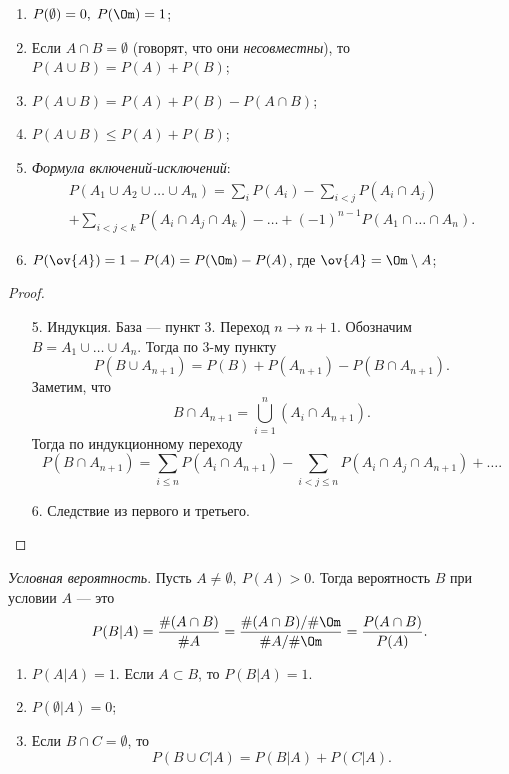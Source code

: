  \begin{properties}[вероятности]
     \begin{enumerate}
         \item $P(\emptyset) = 0, \; P(\Om) = 1$;
         \item Если $A \cap B = \emptyset$ (говорят, что они \textit{несовместны}), то $P(A \cup B) = P(A) + P(B)$;
         \item $P(A \cup B) = P(A) + P(B) - P(A \cap B)$;
         \item $P(A \cup B) \leq P(A) + P(B)$;
         \item \textit{Формула включений-исключений}:
         \begin{multline*}
              P(A_1\cup A_2 \cup \ldots \cup A_n) = \sum_i{P(A_i)} - \sum_{i<j}P(A_i\cap A_j) \\+ \sum_{i<j<k}P(A_i\cap A_j \cap A_k) - \ldots +(-1)^{n-1}P(A_1\cap\ldots\cap A_n).
         \end{multline*}
     
         \item $P(\ov{A}) = 1 - P(A) = P(\Om) - P(A)$, где $\ov{A} = \Om \setminus A$;
     \end{enumerate}
 \end{properties}

 \begin{proof}
 \begin{enumerate}
     \item[5.]Индукция. База --- пункт 3. Переход $n \to n+1$.
    Обозначим $B = A_1 \cup \ldots \cup A_n$. Тогда по 3-му пункту
     $$P(B\cup A_{n+1}) = P(B) +  P(A_{n+1}) - P(B\cap A_{n+1}).$$
    Заметим, что 
    $$B\cap A_{n+1} = \bigcup_{i=1}^n(A_i\cap A_{n+1}).$$
    Тогда по индукционному переходу
    $$P(B\cap A_{n+1}) = \sum_{i\leq n}P(A_i\cap A_{n+1}) - \sum_{i<j\leq n}P(A_i\cap A_j \cap A_{n+1}) + \ldots.$$
    \item[6.] Следствие из первого и третьего. \qedhere
 \end{enumerate}
 \end{proof}


 \begin{definition} \textit{Условная вероятность}. Пусть $A \neq \emptyset, \ P(A) > 0$. Тогда вероятность $B$ при условии $A$ --- это
     $$P(B|A) = \frac{\#(A\cap B)}{\#A} = \frac{\#(A\cap B)/\#\Om}{\#A/\#\Om} = \frac{P(A\cap B)}{P(A)}.$$
 \end{definition}

 \begin{properties}
 \enewline
     \begin{enumerate}
         \item $P(A|A) = 1$.
              Если $A \subset B$, то $P(B|A) = 1$.
         \item $P(\emptyset|A) = 0$;
         \item Если $B \cap C = \emptyset$, то
               $$P(B \cup C| A) = P(B|A)+P(C|A).$$
     \end{enumerate}
 \end{properties}


